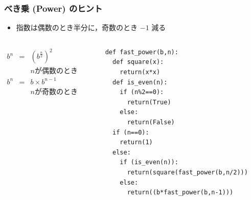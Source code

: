 \begin{frame}
\frametitle{べき乗 (Power) のヒント}
  \begin{itemize}
\item 指数は偶数のとき半分に，奇数のとき $-1$ 減る
  \end{itemize}
  \begin{columns}
    \begin{column}{0.45\textwidth}
      \begin{math}
        \begin{array}{rcl}
b^n &=& (b^{\frac{n}{2}})^{2}\\
&& n \mbox{が偶数のとき}\\
b^n &=& b \times b^{n-1}\\
&& n \mbox{が奇数のとき}
        \end{array}
      \end{math}
    \end{column}
    \begin{column}{0.5\textwidth}
      \begin{lstlisting}[caption={power.py},label=fast_power]
def fast_power(b,n):
  def square(x):
    return(x*x)
  def is_even(n):
    if (n%2==0):
      return(True)
    else:
      return(False)
  if (n==0):
    return(1) 
  else:
    if (is_even(n)):
      return(square(fast_power(b,n/2)))
    else:
      return((b*fast_power(b,n-1)))
      \end{lstlisting}
    \end{column}
  \end{columns}
\end{frame}
